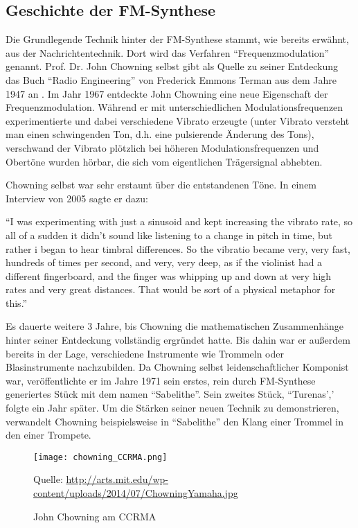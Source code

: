 \subsection{Geschichte der FM-Synthese}
Die Grundlegende Technik hinter der FM-Synthese stammt, wie bereits erwähnt, aus der Nachrichtentechnik. Dort wird das Verfahren ``Frequenzmodulation'' genannt. Prof. Dr. John Chowning selbst gibt als Quelle zu seiner Entdeckung das Buch ``Radio Engineering'' von Frederick Emmons Terman aus dem Jahre 1947 an \cite[s. xy]{soundofinnovation}. Im Jahr 1967 entdeckte John Chowning eine neue Eigenschaft der Frequenzmodulation. Während er mit unterschiedlichen Modulationsfrequenzen experimentierte und dabei verschiedene Vibrato erzeugte (unter Vibrato versteht man einen schwingenden Ton, d.h. eine pulsierende Änderung des Tons), verschwand der Vibrato plötzlich bei höheren Modulationsfrequenzen und Obertöne wurden hörbar, die sich vom eigentlichen Trägersignal abhebten.\cite{fatherofdigitalmusik}

Chowning selbst war sehr erstaunt über die entstandenen Töne. In einem Interview von 2005 sagte er dazu: 

``I was experimenting with just a sinusoid and kept increasing the vibrato rate, so all of a sudden it didn't sound like listening to a change in pitch in time, but rather i began to hear timbral differences. So the vibratio became very, very fast, hundreds of times per second, and very, very deep, as if the violinist had a different fingerboard, and the finger was whipping up and down at very high rates and very great distances. That would be sort of a physical metaphor for this.''\cite[s. xy]{soundofinnovation}

Es dauerte weitere 3 Jahre, bis Chowning die mathematischen Zusammenhänge hinter seiner Entdeckung vollständig ergründet hatte. Bis dahin war er außerdem bereits in der Lage, verschiedene Instrumente wie Trommeln oder Blasinstrumente nachzubilden. Da Chowning selbst leidenschaftlicher Komponist war, veröffentlichte er im Jahre 1971 sein erstes, rein durch FM-Synthese generiertes Stück mit dem namen ``Sabelithe''. Sein zweites Stück, ``Turenas',' folgte ein Jahr später.
Um die Stärken seiner neuen Technik zu demonstrieren, verwandelt Chowning beispielsweise in ``Sabelithe'' den Klang einer Trommel in den einer Trompete.\cite[s. xy]{soundofinnovation}
 
\begin{figure} [ht]
\centering
  \texttt{[image: chowning\_CCRMA.png]}
\caption{John Chowning am CCRMA}
Quelle: \url{http://arts.mit.edu/wp-content/uploads/2014/07/ChowningYamaha.jpg}
\end{figure}
 
